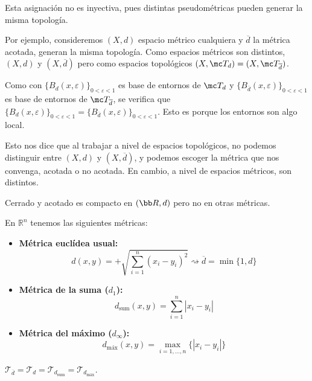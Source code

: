 Esta asignaci\'on no es inyectiva, pues distintas pseudom\'etricas pueden generar la misma topolog\'ia.

\begin{ejem}
    Por ejemplo, consideremos $(X,d)$ espacio m\'etrico cualquiera y $\overline{d}$ la m\'etrica acotada, generan la misma topolog\'ia. Como espacios m\'etricos son distintos, $(X, d)$ y $(X, \overline{d})$ pero como espacios topol\'ogicos $(X, \mc T_d) = (X, \mc T_{\overline{d}})$.

    Como con $\{B_d(x,\varepsilon)\}_{0< \varepsilon < 1}$ es base de entornos de $\mc T_d$ y $\{B_{\overline{d}}(x,\varepsilon)\}_{0< \varepsilon < 1}$ es base de entornos de $\mc T_{\overline{d}}$, se verifica que $\{B_d(x,\varepsilon)\}_{0< \varepsilon < 1} = \{B_{\overline{d}} (x,\varepsilon) \}_{0< \varepsilon < 1}$. Esto es porque los entornos son algo local.
\end{ejem}
\begin{obs}
    Esto nos dice que al trabajar a nivel de espacios topol\'ogicos, no podemos distinguir entre $(X,d)$ y $(X,\overline{d})$, y podemos escoger la m\'etrica que nos convenga, acotada o no acotada. En cambio, a nivel de espacios m\'etricos, son distintos.
\end{obs}
\begin{ejem}
    Cerrado y acotado es compacto en $(\bb R,d)$ pero no en otras m\'etricas.
\end{ejem}

En $\mathbb{R}^n$ tenemos las siguientes métricas:
\begin{itemize}
    \item \textbf{Métrica euclídea usual:} 
    \[
    d(x,y) = +\sqrt{\sum_{i=1}^n (x_i - y_i)^2} \rightsquigarrow \overline{d} = \min\{1, d\}
    \]
    \item \textbf{Métrica de la suma ($d_1$):} 
    \[
    d_{\text{sum}}(x,y) = \sum_{i=1}^n |x_i - y_i|
    \]
    \item \textbf{Métrica del máximo ($d_\infty$):} 
    \[
    d_{\text{máx}}(x,y) = \max_{i=1,\dots,n} \{|x_i - y_i|\}
    \]
\end{itemize}

\begin{teo}
$\mathcal{T}_{\overline{d}} = \mathcal{T}_d = \mathcal{T}_{d_{\text{sum}}} = \mathcal{T}_{d_{\text{máx}}}$.
\end{teo}

